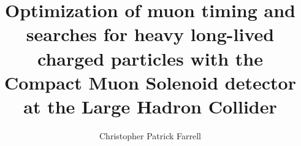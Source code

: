 \documentclass [PhD] {uclathes}
\title          {Optimization of muon timing and searches for heavy
                long-lived charged particles with the
                Compact Muon Solenoid detector at the
                Large Hadron Collider}
\author         {Christopher Patrick Farrell}
\begin{document}
%
\makeintropages

%












%

\newpage


\end{document}
